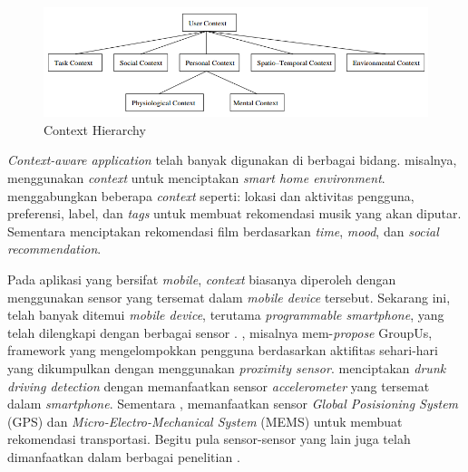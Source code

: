 \begin{figure}[h]
    \centering
    \includegraphics[width=\textwidth]{../../Resources/Images/context}
    \caption{Context Hierarchy \citep{kofod-petersen_case-based_2003}}
    \label{fig:capi-ilustration}
\end{figure}


\textit{Context-aware application} telah banyak digunakan di berbagai bidang. \citep{tsai_context-aware_2016} misalnya, menggunakan \textit{context} untuk menciptakan \textit{smart home environment}. \citep{magara_mplist:_2016} menggabungkan beberapa \textit{context} seperti: lokasi dan aktivitas pengguna, preferensi, label, dan \textit{tags} untuk membuat rekomendasi musik yang akan diputar. Sementara \citep{said_introduction_2013} menciptakan rekomendasi film berdasarkan \textit{time}, \textit{mood}, dan \textit{social recommendation}.


Pada aplikasi yang bersifat \textit{mobile}, \textit{context} biasanya diperoleh dengan menggunakan sensor yang tersemat dalam \textit{mobile device} tersebut. Sekarang ini, telah banyak ditemui \textit{mobile device}, terutama \textit{programmable smartphone}, yang telah dilengkapi dengan berbagai sensor \citep{cao_mobile_2015}. \citep{do_groupus:_2011}, misalnya mem-\textit{propose} GroupUs, framework yang mengelompokkan pengguna berdasarkan aktifitas sehari-hari yang dikumpulkan dengan menggunakan \textit{proximity sensor}. \citep{dai_mobile_2010} menciptakan \textit{drunk driving detection} dengan memanfaatkan sensor \textit{accelerometer} yang tersemat dalam \textit{smartphone}. Sementara \citep{zou_context-aware_2016}, memanfaatkan sensor \textit{Global Posisioning System} (GPS) dan \textit{Micro-Electro-Mechanical System} (MEMS) untuk membuat rekomendasi transportasi. Begitu pula sensor-sensor yang lain juga telah dimanfaatkan dalam berbagai penelitian \citep{dai_perfalld:_2010, lu_soundsense:_2009, bao_movi:_2010, rubel_toward_2005, atzmueller_towards_2013}.



